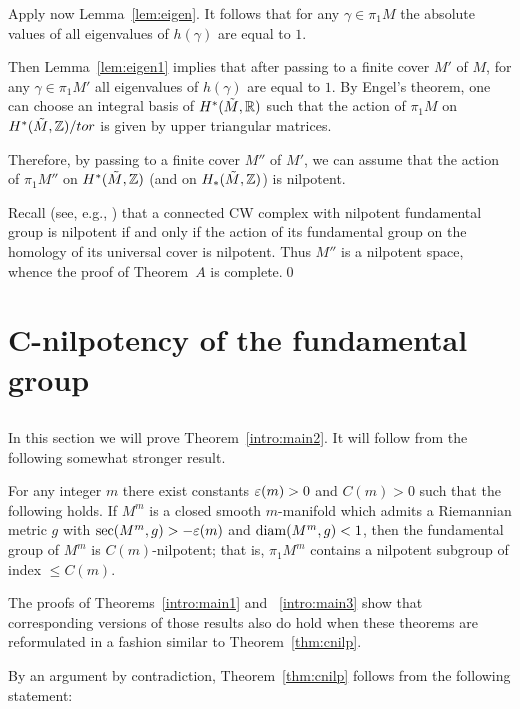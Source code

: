 \documentclass{amsart}
\begin{document}
Apply now Lemma~\ref{lem:eigen}. It follows
that for any $\gamma\in \pi_1M$
the absolute values of all  eigenvalues of $h(\gamma)$ are equal to $1$.

Then Lemma~\ref{lem:eigen1}  implies that after passing to a finite
cover $M'$ of $M$,
for any $\gamma\in \pi_1M'$
all eigenvalues of $h(\gamma)$ are equal to $1$.
By Engel's theorem, one can choose an integral basis
of $H^*(\tilde M,{\Bbb R} )$
such that the action of $\pi_1M$
on $H^*(\tilde M, {\Bbb Z})/tor$ is given by upper triangular matrices.

Therefore, by passing to a finite cover $M''$ of $M'$,
we can assume that the action of $\pi_1M''$
on $H^*(\tilde M,{\Bbb Z} )$  (and  on $H_*(\tilde M,{\Bbb Z} )$)  is nilpotent.

Recall (see, e.g., \cite[2.19]{HMR})
that a connected CW complex with nilpotent fundamental group
is nilpotent if and only if the action of
its fundamental group on the homology of its universal cover is nilpotent.
Thus $M''$ is a nilpotent space, whence the proof of Theorem~$A$
is complete.\qed









\section{C-nilpotency of the fundamental group}\label{sec:c-nilp}

\subsection{}In this section we will prove Theorem~\ref{intro:main2}. It will follow
from the following somewhat stronger result.




\begin{thm}\label{thm:cnilp}
For any integer $m$ there exist constants $\varepsilon(m)>0$  and $C(m)>0$ such that
the following holds.
If
$M^m$ is a closed smooth $m$-manifold which admits
a Riemannian metric $g$ with
$\sec(M^m,g)> -\varepsilon(m)$ and $\operatorname{\rm diam}(M^m,g)< 1$,
then the fundamental group of $M^m$ is $C(m)$-nilpotent; 
that is,
$\pi_1M^m$ contains a nilpotent subgroup of index $\le C(m)$.
\end{thm}
\begin{rmk} %
The proofs of Theorems~\ref{intro:main1} and ~\ref{intro:main3} show
that
corresponding versions of those results
also do hold when these theorems are reformulated
in a fashion similar to Theorem~\ref{thm:cnilp}.
\end{rmk}
By an argument by contradiction,
Theorem~\ref{thm:cnilp} follows
from the following  statement:
\end{document}
